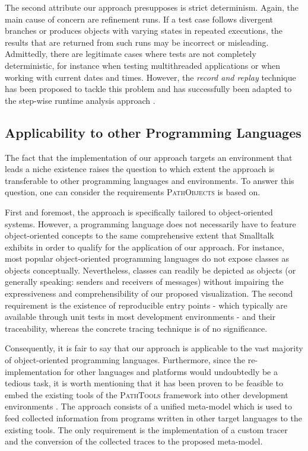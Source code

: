 The second attribute our approach presupposes is strict determinism.
Again, the main cause of concern are refinement runs.
If a test case follows divergent branches or produces objects with varying states in repeated executions, the results that are returned from such runs may be incorrect or misleading.
Admittedly, there are legitimate cases where tests are not completely deterministic, for instance when testing multithreaded applications or when working with current dates and times.
However, the \emph{record and replay} technique has been proposed to tackle this problem \cite{choi_deterministic_1998} and has successfully been adapted to the step-wise runtime analysis approach \cite{felgentreff_comparison_2012}.

\subsection{Applicability to other Programming Languages}
\label{ss:DiscussionApplicability}
The fact that the implementation of our approach targets an environment that leads a niche existence raises the question to which extent the approach is transferable to other programming languages and environments.
To answer this question, one can consider the requirements \textsc{PathObjects} is based on.

First and foremost, the approach is specifically tailored to object-oriented systems.
However, a programming language does not necessarily have to feature object-oriented concepts to the same comprehensive extent that Smalltalk exhibits in order to qualify for the application of our approach.
For instance, most popular object-oriented programming languages do not expose classes as objects conceptually. 
Nevertheless, classes can readily be depicted as objects (or generally speaking: senders and receivers of messages) without impairing the expressiveness and comprehensibility of our proposed visualization.
The second requirement is the existence of reproducible entry points - which typically are available through unit tests in most development environments - and their traceability, whereas the concrete tracing technique is of no significance.

Consequently, it is fair to say that our approach is applicable to the vast majority of object-oriented programming languages.
Furthermore, since the re-implementation for other languages and platforms would undoubtedly be a tedious task, it is worth mentioning that it has been proven to be feasible to embed the existing tools of the \textsc{PathTools} framework into other development environments \cite{richter_integration_2013}.
The approach consists of a unified meta-model which is used to feed collected information from programs written in other target languages to the existing tools.
The only requirement is the implementation of a custom tracer and the conversion of the collected traces to the proposed meta-model.